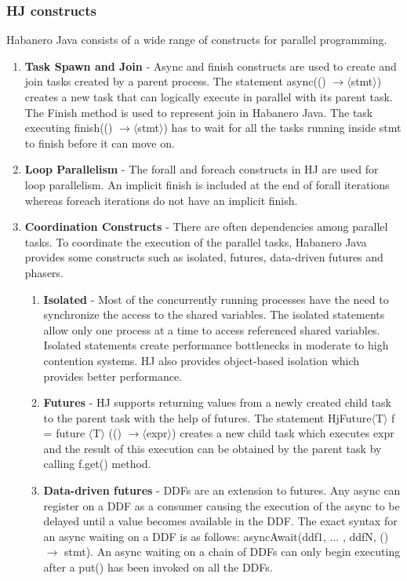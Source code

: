 \subsubsection{HJ constructs}
Habanero Java consists of a wide range of constructs for parallel programming.
\begin{enumerate}
\item \textbf{Task Spawn and Join} - Async and finish constructs are used to create and join tasks created by a parent process. The statement async(() $ \rightarrow \langle$stmt$\rangle$) creates a new task that can logically execute in parallel with its parent task. The Finish method is used to represent join in Habanero Java. The task executing finish(() $ \rightarrow \langle$stmt$\rangle$) has to wait for all the tasks running inside stmt to finish before it can move on.
\item \textbf{Loop Parallelism} - The forall and foreach constructs in HJ are used for loop parallelism. An implicit finish is included at the end of forall iterations whereas foreach iterations do not have an implicit finish. 
\item \textbf{Coordination Constructs} - There are often dependencies among parallel tasks. To coordinate the execution of the parallel tasks, Habanero Java provides some constructs such as isolated, futures, data-driven futures and phasers.
\begin{enumerate}
\item \textbf{Isolated} - Most of the concurrently running processes have the need to synchronize the access to the shared variables. The isolated statements allow only one process at a time to access referenced shared variables. Isolated statements create performance bottlenecks in moderate to high contention systems. HJ also provides object-based isolation which provides better performance.
\item \textbf{Futures} - HJ supports returning values from a newly created child task to the parent task with the help of futures. The statement HjFuture$\langle$T$\rangle$ f = future $\langle$T$\rangle$ (() $ \rightarrow \langle$expr$\rangle$) creates a new child task which executes expr and the result of this execution can be obtained by the parent task by calling f.get() method.
\item \textbf{Data-driven futures} - DDFs are an extension to futures. Any async can register on a DDF as a consumer causing the execution of the async to be delayed until a value becomes available in the DDF. The exact syntax for an async waiting on a DDF is as follows: asyncAwait(ddf1, ... , ddfN, () $\rightarrow$ stmt). An async waiting on a chain of DDFs can only begin executing after a put() has been invoked on all the DDFs.

\end{enumerate}
\end{enumerate}
